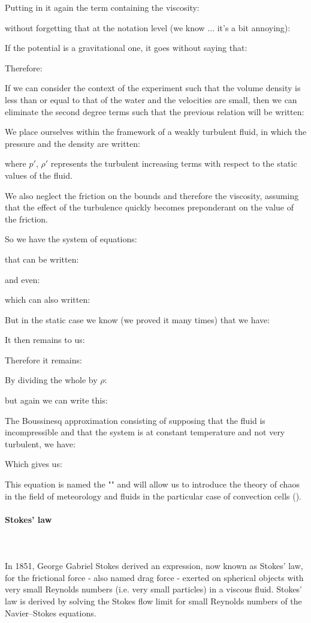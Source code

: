 	Putting in it again the term containing the viscosity:
	
	without forgetting that at the notation level (we know ... it's a bit annoying):
	
	If the potential is a gravitational one, it goes without saying that:
	
	Therefore:
	
	
	If we can consider the context of the experiment such that the volume density is less than or equal to that of the water and the velocities are small, then we can eliminate the second degree terms such that the previous relation will be written:
	
	We place ourselves within the framework of a weakly turbulent fluid, in which the pressure and the density are written:
	
	where $p'$, $\rho'$ represents the turbulent increasing terms with respect to the static values of the fluid.

	We also neglect the friction on the bounds and therefore the viscosity, assuming that the effect of the turbulence quickly becomes preponderant on the value of the friction.

	So we have the system of equations:
	
	that can be written:
	
	and even:
	
	which can also written:
	
	But in the static case we know (we proved it many times) that we have:
	
	It then remains to us:
	
	Therefore it remains:
	
	By dividing the whole by $\rho$:
	
	but again we can write this:
	
	The Boussinesq approximation  consisting of supposing that the fluid is incompressible and that the system is at constant temperature and not very turbulent, we have:
	
	Which gives us:
	
	This equation is named the "" and will allow us to introduce the theory of chaos in the field of meteorology and fluids in the particular case of convection cells ().
	
	\paragraph{Stokes' law}\mbox{}\\\\
	In 1851, George Gabriel Stokes derived an expression, now known as Stokes' law, for the frictional force - also named drag force - exerted on spherical objects with very small Reynolds numbers (i.e. very small particles) in a viscous fluid. Stokes' law is derived by solving the Stokes flow limit for small Reynolds numbers of the Navier–Stokes equations.
	
